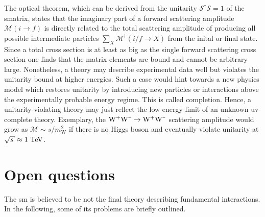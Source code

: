 The optical theorem, which can be derived from the unitarity $\mathcal{S}^{\dagger}\mathcal{S}=1$ of the \gls{smatrix}, states that the imaginary part of a forward scattering amplitude $\mathcal{M}(i\to f)$ is directly related to the total scattering amplitude of producing all possible intermediate particles $\sum_{X}\mathcal{M}^\dagger(i/f\to X)$ from the inital or final state. Since a total cross section is at least as big as the single forward scattering cross section one finds that the matrix elements are bound and cannot be arbitrary large. Nonetheless, a theory may describe experimental data well but violates the unitarity bound at higher energies. Such a case would hint towards a new physics model which restores unitarity by introducing new particles or interactions above the experimentally probable energy regime. This is called  completion. Hence, a unitarity-violating theory may just reflect the low energy limit of an unknown \gls{uv}-complete theory. Exemplary, the $\mathrm{W}^{\rmplus}\mathrm{W}^{\rmminus}\to\mathrm{W}^{\rmplus}\mathrm{W}^{\rmminus}$ scattering amplitude would grow as $\mathcal{M}\sim s/m_\mathrm{W}^2$ if there is no Higgs boson and eventually violate unitarity at $\sqrt{s}\approx1~\TeV$.


\section{Open questions}

The \gls{sm} is believed to be not the final theory describing fundamental interactions. In the following, some of its problems are briefly outlined.

